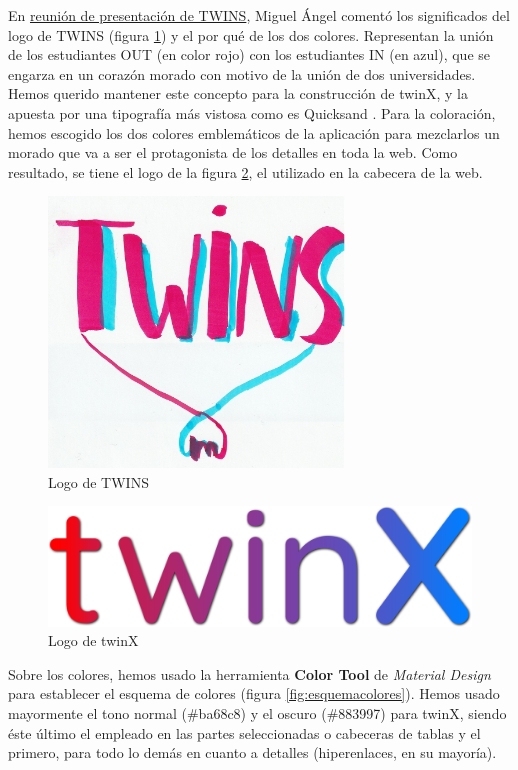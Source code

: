 En \hyperref[reunion3]{reunión de presentación de TWINS}, Miguel Ángel comentó los significados del logo de TWINS (figura \ref{fig:logotwins}) y el por qué de los dos colores. Representan la unión de los estudiantes OUT (en color rojo) con los estudiantes IN (en azul), que se engarza en un corazón morado con motivo de la unión de dos universidades. Hemos querido mantener este concepto para la construcción de twinX, y la apuesta por una tipografía más vistosa como es Quicksand \cite{quicksand}. Para la coloración, hemos escogido los dos colores emblemáticos de la aplicación para mezclarlos un morado que va a ser el protagonista de los detalles en toda la web. Como resultado, se tiene el logo de la figura \ref{fig:logotwinX}, el utilizado en la cabecera de la web.

\begin{figure}
	\centering
	\includegraphics[width=0.7\textwidth, height=0.4\textheight]{img/logotwins}
	\caption{Logo de TWINS}
	\label{fig:logotwins}
\end{figure}

\begin{figure}
	\centering
	\includegraphics[width=\textwidth]{img/logo}
	\caption{Logo de twinX}
	\label{fig:logotwinX}
\end{figure}

Sobre los colores, hemos usado la herramienta \textbf{Color Tool} de \textit{Material Design} para establecer el esquema de colores (figura \ref{fig:esquemacolores}). Hemos usado mayormente el tono normal (\#ba68c8) y el oscuro (\#883997) para twinX, siendo éste último el empleado en las partes seleccionadas o cabeceras de tablas y el primero, para todo lo demás en cuanto a detalles (hiperenlaces, en su mayoría).

